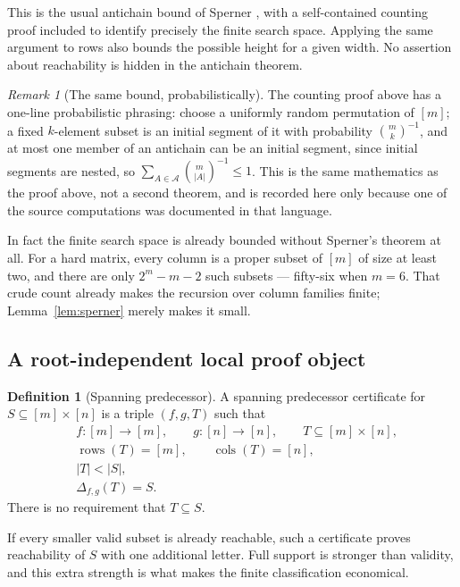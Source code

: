 \documentclass[11pt,letterpaper]{article}
\numberwithin{equation}{section}
\theoremstyle{definition}
\newtheorem{definition}[theorem]{Definition}
\theoremstyle{remark}
\newtheorem{remark}[theorem]{Remark}
\newcommand{\suppR}{\operatorname{rows}}
\newcommand{\suppC}{\operatorname{cols}}
\begin{document}
This is the usual antichain bound of Sperner \cite{Sperner1928}, with a
self-contained counting proof included to identify precisely the finite
search space. Applying the same argument to rows also bounds the possible
height for a given width. No assertion about reachability is hidden in the
antichain theorem.

\begin{remark}[The same bound, probabilistically]\label{rem:sperner-prob}
The counting proof above has a one-line probabilistic phrasing: choose a
uniformly random permutation of $[m]$; a fixed $k$-element subset is an
initial segment of it with probability $\binom{m}{k}^{-1}$, and at most one
member of an antichain can be an initial segment, since initial segments are
nested, so $\sum_{A\in\mathcal A}\binom{m}{|A|}^{-1}\le1$. This is the same
mathematics as the proof above, not a second theorem, and is recorded here
only because one of the source computations was documented in that language.
\end{remark}

In fact the finite search space is already bounded without Sperner's theorem
at all. For a hard matrix, every column is a proper subset of $[m]$ of size at
least two, and there are only $2^m-m-2$ such subsets --- fifty-six when $m=6$.
That crude count already makes the recursion over column families finite;
Lemma~\ref{lem:sperner} merely makes it small.

\subsection{A root-independent local proof object}
\begin{definition}[Spanning predecessor]\label{def:certificate}
A spanning predecessor certificate for $S\subseteq[m]\times[n]$ is a triple
$(f,g,T)$ such that
\begin{align}
 &f:[m]\to[m],\qquad g:[n]\to[n],\qquad T\subseteq[m]\times[n],
   \label{eq:certificate-ranges}\\
 &\suppR(T)=[m],\qquad\suppC(T)=[n],\label{eq:certificate-span}\\
 &|T|<|S|,\label{eq:certificate-size}\\
 &\Delta_{f,g}(T)=S.\label{eq:certificate-image}
\end{align}
There is no requirement that $T\subseteq S$.
\end{definition}

If every smaller valid subset is already reachable, such a certificate
proves reachability of $S$ with one additional letter. Full support is
stronger than validity, and this extra strength is what makes the finite
classification economical.
\end{document}
